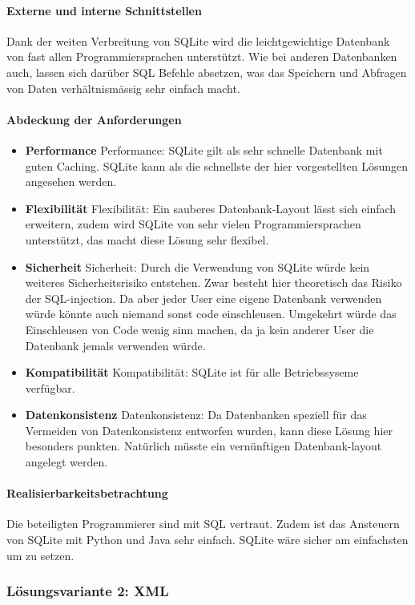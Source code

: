 \documentclass[10pt,paper=a4,final]{scrartcl}
\begin{document}
\paragraph{Externe und interne Schnittstellen}
Dank der weiten Verbreitung von SQLite wird die leichtgewichtige Datenbank von fast allen Programmiersprachen unterstützt. Wie bei anderen Datenbanken auch, lassen sich darüber SQL Befehle absetzen, was das Speichern und Abfragen von Daten verhältnismässig sehr einfach macht.
\paragraph{Abdeckung der Anforderungen}
\begin{itemize}
  \item {\bf Performance} Performance: SQLite gilt als sehr schnelle Datenbank mit guten Caching. SQLite kann als die schnellste der hier vorgestellten Lösungen angesehen werden.
  \item {\bf Flexibilität} Flexibilität: Ein sauberes Datenbank-Layout lässt sich einfach erweitern, zudem wird SQLite von sehr vielen Programmiersprachen unterstützt, das macht diese Lösung sehr flexibel.
  \item {\bf Sicherheit} Sicherheit: Durch die Verwendung von SQLite würde kein weiteres Sicherheitsrisiko entstehen. Zwar besteht hier theoretisch das Risiko der SQL-injection. Da aber jeder User eine eigene Datenbank verwenden würde könnte auch niemand sonst code einschleusen. Umgekehrt würde das Einschleusen von Code wenig sinn machen, da ja kein anderer User die Datenbank jemals verwenden w\"urde.
  \item {\bf Kompatibilit\"at} Kompatibilität: SQLite ist für alle Betriebssyseme verfügbar.
  \item {\bf Datenkonsistenz} Datenkonsistenz: Da Datenbanken speziell für das Vermeiden von Datenkonsistenz entworfen wurden, kann diese Lösung hier besonders punkten. Natürlich müsste ein vernünftigen Datenbank-layout angelegt werden.
\end{itemize}
\paragraph{Realisierbarkeitsbetrachtung}
Die beteiligten Programmierer sind mit SQL vertraut. Zudem ist das Ansteuern von SQLite mit Python und Java sehr einfach. SQLite w\"are sicher am einfachsten um zu setzen.
\subsubsection{L\"osungsvariante 2: XML}
\end{document}
